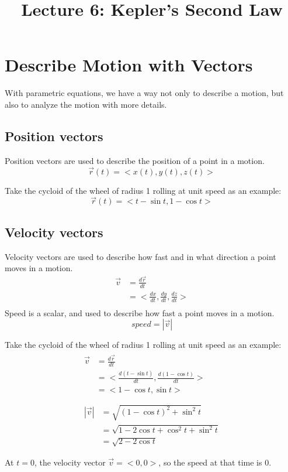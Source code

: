 \documentclass{article}
\title{Lecture 6: Kepler's Second Law}
\author{}
\date{}
\begin{document}
    
\maketitle

\section{Describe Motion with Vectors}

With parametric equations, we have a way not only to describe a motion, but also 
to analyze the motion with more details.

\subsection{Position vectors}

Position vectors are used to describe the position of a point in a motion.
\[
  \vec{r}(t) = <x(t), y(t), z(t)>
\]

Take the cycloid of the wheel of radius 1 rolling at unit speed as an example:
\[
  \vec{r}(t) = <t - \sin t, 1 - \cos t>
\]

\subsection{Velocity vectors}

Velocity vectors are used to describe how fast and in what direction a point 
moves in a motion.
\begin{equation*}
\begin{split}
  \vec{v} &= \frac{d\vec{r}}{dt} \\
          &= <\frac{dx}{dt}, \frac{dy}{dt}, \frac{dz}{dt}> \\
\end{split}
\end{equation*}
Speed is a scalar, and used to describe how fast a point moves in a motion.
\begin{equation*}
  speed = |\vec{v}|
\end{equation*}

Take the cycloid of the wheel of radius 1 rolling at unit speed as an example:
\begin{gather*}
  \begin{split}
    \vec{v} &= \frac{d\vec{r}}{dt} \\
            &= <\frac{d(t - \sin t)}{dt}, \frac{d(1 - \cos t)}{dt}> \\
            &= <1 - \cos t, \sin t> \\
  \end{split} \\
  \begin{split}
    |\vec{v}| &= \sqrt{(1 - \cos t)^2 + \sin^2 t} \\
              &= \sqrt{1 - 2\cos t + \cos^2 t + \sin^2 t} \\
              &= \sqrt{2 - 2\cos t} \\
  \end{split} \\
\end{gather*}
At $t = 0$, the velocity vector $\vec{v} = <0, 0>$, so the speed at that time is
0.
\end{document}
